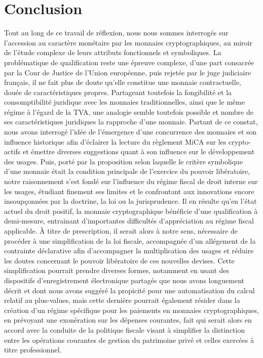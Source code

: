 {\chapter*{Conclusion}
Tout au long de ce travail de réflexion, nous nous sommes interrogés sur l'accession au caractère monétaire par les monnaies cryptographiques, au miroir de l'étude complexe de leurs attributs fonctionnels et symboliques. La problématique de qualification reste une épreuve complexe, d'une part consacrée par la Cour de Justice de l'Union européenne, puis rejetée par le juge judiciaire français, il ne fait plus de doute qu'elle constitue une monnaie contractuelle, douée de caractéristiques propres. Partageant toutefois la fongibilité et la consomptibilité juridique avec les monnaies traditionnelles, ainsi que le même régime à l'égard de la TVA, une analogie semble toutefois possible et nombre de ses caractéristiques juridiques la rapproche d'une monnaie. Partant de ce constat, nous avons interrogé l'idée de l'émergence d'une concurrence des monnaies et son influence historique afin d'éclairer la lecture du règlement MiCA sur les crypto-actifs et émettre diverses suggestions quant à son influence sur le développement des usages. Puis, porté par la proposition selon laquelle le critère symbolique d'une monnaie était la condition principale de l'exercice du pouvoir libératoire, notre raisonnement s'est fondé sur l'influence du régime fiscal de droit interne sur les usages, étudiant finement ses limites et le confrontant aux innovations encore insoupçonnées par la doctrine, la loi ou la jurisprudence. Il en résulte qu'en l'état actuel du droit positif, la monnaie cryptographique bénéficie d'une qualification à demi-mesure, entrainant d'importantes difficultés d'appréciation au régime fiscal applicable. À titre de prescription, il serait alors à notre sens, nécessaire de procéder à une simplification de la loi fiscale, accompagnée d'un allégement de la contrainte déclarative afin d'accompagner la multiplication des usages et réduire les doutes concernant le pouvoir libératoire de ces nouvelles devises. Cette simplification pourrait prendre diverses formes, notamment en usant des dispositifs d'enregistrement électronique partagés que nous avons longuement décrit et dont nous avons suggéré la propicité pour une automatisation du calcul relatif au plus-values, mais cette dernière pourrait également résider dans la création d'un régime spécifique pour les paiements en monnaies cryptographiques, en prévoyant une exonération sur les dépenses courantes, fait qui serait alors en accord avec la conduite de la politique fiscale visant à simplifier la distinction entre les opérations courantes de gestion du patrimoine privé et celles exercées à titre professionnel.












}
